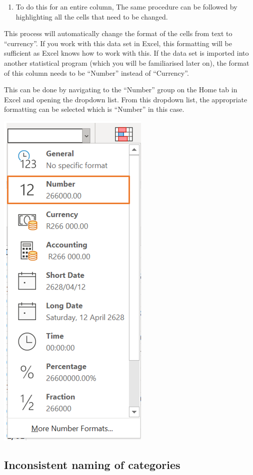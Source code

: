 \documentclass[
]{book}
\providecommand{\tightlist}{%
  \setlength{\itemsep}{0pt}\setlength{\parskip}{0pt}}
\begin{document}
\begin{enumerate}
\def\labelenumi{\arabic{enumi}.}
\setcounter{enumi}{3}
\tightlist
\item
  To do this for an entire column, The same procedure can be followed by highlighting all the cells that need to be changed.
\end{enumerate}

This process will automatically change the format of the cells from text to ``currency''. If you work with this data set in Excel, this formatting will be sufficient as Excel knows how to work with this. If the data set is imported into another statistical program (which you will be familiarised later on), the format of this column needs to be ``Number'' instead of ``Currency''.

This can be done by navigating to the ``Number'' group on the Home tab in Excel and opening the dropdown list. From this dropdown list, the appropriate formatting can be selected which is ``Number'' in this case.

\begin{center}\includegraphics[width=0.4\linewidth]{Figures/cleaning_formatting_4} \end{center}

\subsection*{Inconsistent naming of categories}\label{inconsistent-naming-of-categories}
\end{document}
